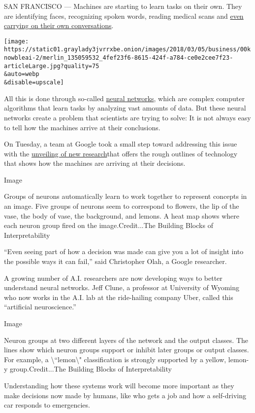 SAN FRANCISCO --- Machines are starting to learn tasks on their own.
They are identifying faces, recognizing spoken words, reading medical
scans and
\href{https://www.nytimes3xbfgragh.onion/interactive/2018/02/21/technology/conversational-bots.html}{even
carrying on their own conversations}.

\texttt{[image: https://static01.graylady3jvrrxbe.onion/images/2018/03/05/business/00knowbleai-2/merlin\_135059532\_4fef23f6-8615-424f-a784-ce0e2cee7f23-articleLarge.jpg?quality=75\\\&auto=webp\\\&disable=upscale]}

All this is done through so-called
\href{https://www.wired.com/2015/04/jeff-dean/}{neural networks}, which
are complex computer algorithms that learn tasks by analyzing vast
amounts of data. But these neural networks create a problem that
scientists are trying to solve: It is not always easy to tell how the
machines arrive at their conclusions.

On Tuesday, a team at Google took a small step toward addressing this
issue with the \href{https://distill.pub/2018/building-blocks}{unveiling
of new research}that offers the rough outlines of technology that shows
how the machines are arriving at their decisions.

Image

Groups of neurons automatically learn to work together to represent
concepts in an image. Five groups of neurons seem to correspond to
flowers, the lip of the vase, the body of vase, the background, and
lemons. A heat map shows where each neuron group fired on the
image.Credit...The Building Blocks of Interpretability

``Even seeing part of how a decision was made can give you a lot of
insight into the possible ways it can fail,'' said Christopher Olah, a
Google researcher.

A growing number of A.I. researchers are now developing ways to better
understand neural networks. Jeff Clune, a professor at University of
Wyoming who now works in the A.I. lab at the ride-hailing company Uber,
called this ``artificial neuroscience.''

Image

Neuron groups at two different layers of the network and the output
classes. The lines show which neuron groups support or inhibit later
groups or output classes. For example, a
\textbackslash{}``lemon\textbackslash{}" classification is strongly
supported by a yellow, lemon-y group.Credit...The Building Blocks of
Interpretability

Understanding how these systems work will become more important as they
make decisions now made by humans, like who gets a job and how a
self-driving car responds to emergencies.

